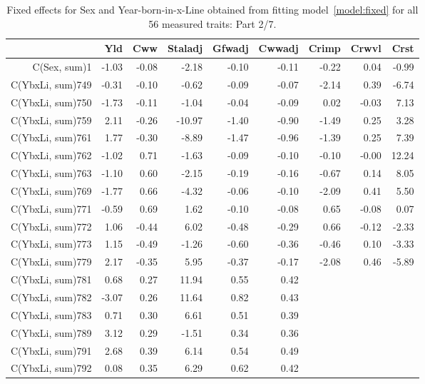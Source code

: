 \begin{table}[p]
\centering
\caption{Fixed effects for Sex and Year-born-in-x-Line obtained from fitting model~\ref{model:fixed} for all 56 measured traits: Part 2/7.}
\label{tab:b2}
\begin{tabular}{rrrrrrrrr}
  \hline
 & Yld & Cww & Staladj & Gfwadj & Cwwadj & Crimp & Crwvl & Crst \\ 
  \hline
C(Sex, sum)1 & -1.03 & -0.08 & -2.18 & -0.10 & -0.11 & -0.22 & 0.04 & -0.99 \\ 
  C(YbxLi, sum)749 & -0.31 & -0.10 & -0.62 & -0.09 & -0.07 & -2.14 & 0.39 & -6.74 \\ 
  C(YbxLi, sum)750 & -1.73 & -0.11 & -1.04 & -0.04 & -0.09 & 0.02 & -0.03 & 7.13 \\ 
  C(YbxLi, sum)759 & 2.11 & -0.26 & -10.97 & -1.40 & -0.90 & -1.49 & 0.25 & 3.28 \\ 
  C(YbxLi, sum)761 & 1.77 & -0.30 & -8.89 & -1.47 & -0.96 & -1.39 & 0.25 & 7.39 \\ 
  C(YbxLi, sum)762 & -1.02 & 0.71 & -1.63 & -0.09 & -0.10 & -0.10 & -0.00 & 12.24 \\ 
  C(YbxLi, sum)763 & -1.10 & 0.60 & -2.15 & -0.19 & -0.16 & -0.67 & 0.14 & 8.05 \\ 
  C(YbxLi, sum)769 & -1.77 & 0.66 & -4.32 & -0.06 & -0.10 & -2.09 & 0.41 & 5.50 \\ 
  C(YbxLi, sum)771 & -0.59 & 0.69 & 1.62 & -0.10 & -0.08 & 0.65 & -0.08 & 0.07 \\ 
  C(YbxLi, sum)772 & 1.06 & -0.44 & 6.02 & -0.48 & -0.29 & 0.66 & -0.12 & -2.33 \\ 
  C(YbxLi, sum)773 & 1.15 & -0.49 & -1.26 & -0.60 & -0.36 & -0.46 & 0.10 & -3.33 \\ 
  C(YbxLi, sum)779 & 2.17 & -0.35 & 5.95 & -0.37 & -0.17 & -2.08 & 0.46 & -5.89 \\ 
  C(YbxLi, sum)781 & 0.68 & 0.27 & 11.94 & 0.55 & 0.42 &  &  &  \\ 
  C(YbxLi, sum)782 & -3.07 & 0.26 & 11.64 & 0.82 & 0.43 &  &  &  \\ 
  C(YbxLi, sum)783 & 0.71 & 0.30 & 6.61 & 0.51 & 0.39 &  &  &  \\ 
  C(YbxLi, sum)789 & 3.12 & 0.29 & -1.51 & 0.34 & 0.36 &  &  &  \\ 
  C(YbxLi, sum)791 & 2.68 & 0.39 & 6.14 & 0.54 & 0.49 &  &  &  \\ 
  C(YbxLi, sum)792 & 0.08 & 0.35 & 6.29 & 0.62 & 0.42 &  &  &  \\ 

\end{tabular}
\end{table}
